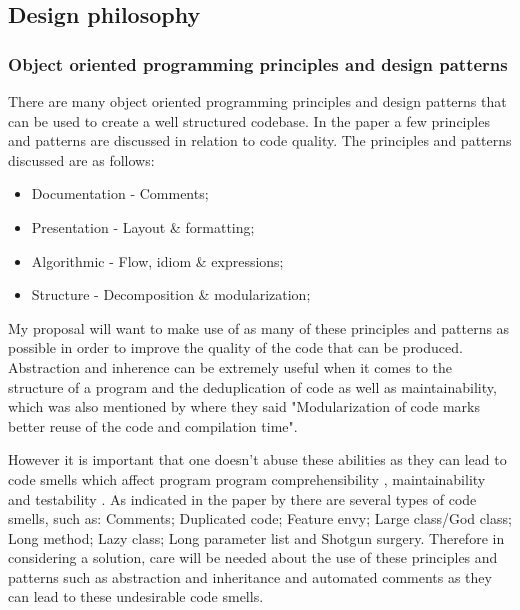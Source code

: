 \subsection{Design philosophy}

\subsubsection{Object oriented programming principles and design patterns}

There are many object oriented programming principles and design patterns that can be used to create a well structured codebase. In the paper \cite{10.1145/3428029.3428047} a few principles and patterns are discussed in relation to code quality. The principles and patterns discussed are as follows:
\begin{itemize}
	\item Documentation - Comments;
	\item Presentation - Layout \& formatting;
	\item Algorithmic - Flow, idiom \& expressions;
	\item Structure - Decomposition \& modularization;
\end{itemize}

My proposal will want to make use of as many of these principles and patterns as possible in order to improve the quality of the code that can be produced. Abstraction and inherence can be extremely useful when it comes to the structure of a program and the deduplication of code as well as maintainability, which was also mentioned by \cite{8681007} where they said "Modularization of code marks better reuse of the code and compilation time".

However it is important that one doesn't abuse these abilities as they can lead to code smells which affect program program comprehensibility \citep{8681007, ImpactOfAntipatterns}, maintainability \citep{8681007, ImpactOfAntipatterns2, CodeSmellsAndMaintainability} and testability \citep{8681007, TestCasesAndCodeQuality}. As indicated in the paper by \cite{10.1145/3555228.3555268} there are several types of code smells, such as: Comments; Duplicated code; Feature envy; Large class/God class; Long method; Lazy class; Long parameter list and Shotgun surgery. Therefore in considering a solution, care will be needed about the use of these principles and patterns such as abstraction and inheritance and automated comments as they can lead to these undesirable code smells.
